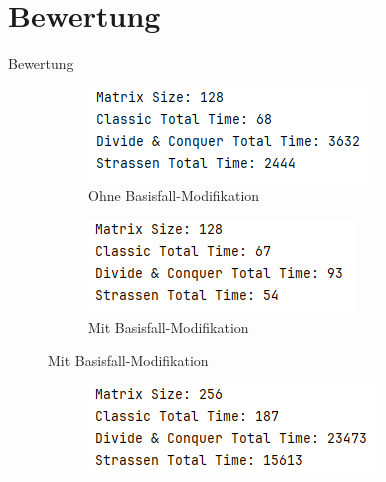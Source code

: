 \documentclass{beamer}
\begin{document}
\section{Bewertung}
\begin{frame}{Bewertung}

     {
    \uncover<+-> {
        \begin{figure}[H]
            \centering
            \begin{subfigure}[b]{0.4\textwidth}
                \includegraphics[width=\textwidth]{128Without.PNG}
                \caption{Ohne Basisfall-Modifikation}
            \end{subfigure}
            \begin{subfigure}[b]{0.4\textwidth}
                \includegraphics[width=\textwidth]{128With.PNG}
                \caption{Mit Basisfall-Modifikation}
            \end{subfigure}
        \end{figure}
    }
    \uncover<+-> {
        \begin{figure}[H]
            \centering
            \begin{subfigure}[b]{0.4\textwidth}
                \includegraphics[width=\textwidth]{256Without.PNG}

\end{subfigure}
\end{figure}}}
\end{frame}
\end{document}
